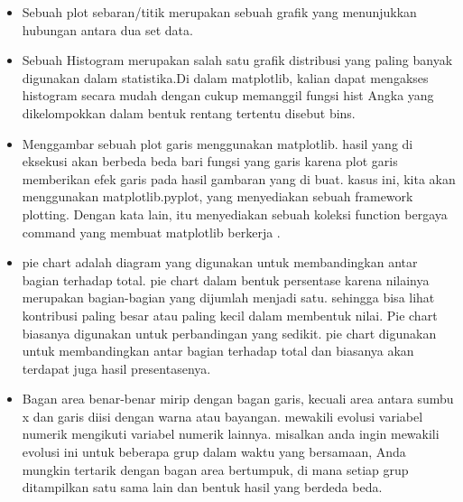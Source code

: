 \begin{itemize}
\item Sebuah plot sebaran/titik merupakan sebuah grafik yang menunjukkan hubungan antara dua set data.



\item Sebuah Histogram merupakan salah satu grafik distribusi yang paling banyak digunakan dalam statistika.Di dalam matplotlib, kalian dapat mengakses histogram secara mudah dengan cukup memanggil
fungsi hist Angka yang dikelompokkan dalam bentuk rentang tertentu disebut bins.






\item Menggambar sebuah plot garis menggunakan matplotlib. hasil yang di eksekusi akan berbeda beda bari fungsi yang garis karena plot garis memberikan efek garis pada hasil gambaran yang di buat. kasus ini, kita akan menggunakan matplotlib.pyplot, yang menyediakan sebuah framework plotting. Dengan kata lain, itu menyediakan sebuah koleksi function bergaya command yang membuat matplotlib berkerja .





\item pie chart adalah diagram yang digunakan untuk membandingkan antar bagian terhadap total. pie chart dalam bentuk persentase karena nilainya merupakan bagian-bagian yang dijumlah menjadi satu. sehingga bisa lihat kontribusi paling besar atau paling kecil dalam membentuk nilai. Pie chart biasanya digunakan untuk perbandingan yang sedikit. pie chart digunakan untuk membandingkan antar bagian terhadap total dan biasanya akan terdapat juga hasil presentasenya.



\item Bagan area benar-benar mirip dengan bagan garis, kecuali area antara sumbu x dan garis diisi dengan warna atau bayangan. mewakili evolusi variabel numerik mengikuti variabel numerik lainnya. misalkan anda ingin mewakili evolusi ini untuk beberapa grup dalam waktu yang bersamaan, Anda mungkin tertarik dengan bagan area bertumpuk, di mana setiap grup ditampilkan satu sama lain dan bentuk hasil yang berdeda beda.


\end{itemize}
